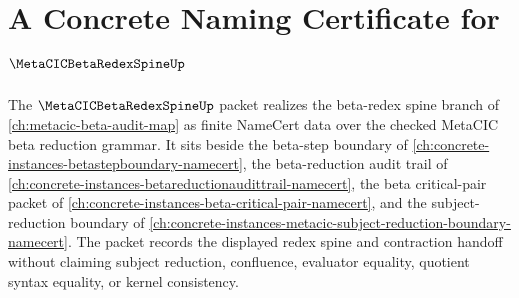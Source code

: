 \chapter{A Concrete Naming Certificate for $\MetaCICBetaRedexSpineUp$}
\label{ch:concrete-instances-metacic-beta-redex-spine-namecert}

The $\MetaCICBetaRedexSpineUp$ packet realizes the beta-redex spine branch of \autoref{ch:metacic-beta-audit-map} as finite NameCert data over the checked MetaCIC beta reduction grammar. It sits beside the beta-step boundary of \autoref{ch:concrete-instances-betastepboundary-namecert}, the beta-reduction audit trail of \autoref{ch:concrete-instances-betareductionaudittrail-namecert}, the beta critical-pair packet of \autoref{ch:concrete-instances-beta-critical-pair-namecert}, and the subject-reduction boundary of \autoref{ch:concrete-instances-metacic-subject-reduction-boundary-namecert}. The packet records the displayed redex spine and contraction handoff without claiming subject reduction, confluence, evaluator equality, quotient syntax equality, or kernel consistency.

